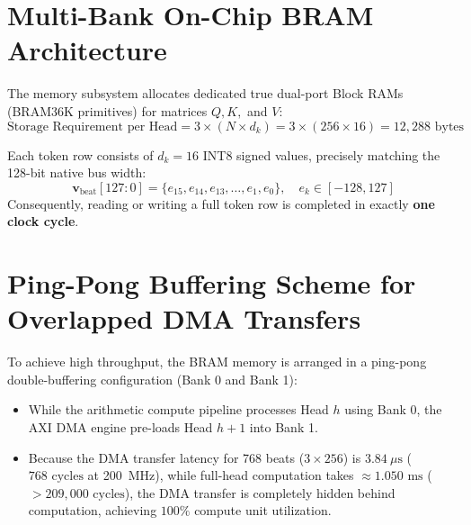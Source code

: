\section{Multi-Bank On-Chip BRAM Architecture}
The memory subsystem allocates dedicated true dual-port Block RAMs (BRAM36K primitives) for matrices $Q, K,$ and $V$:
\begin{equation}
    \text{Storage Requirement per Head} = 3 \times (N \times d_k) = 3 \times (256 \times 16) = 12,288\text{ bytes}
\end{equation}

Each token row consists of $d_k = 16$ INT8 signed values, precisely matching the 128-bit native bus width:
\begin{equation}
    \mathbf{v}_{\text{beat}}[127:0] = \{e_{15}, e_{14}, e_{13}, \dots, e_1, e_0\}, \quad e_k \in [-128, 127]
\end{equation}
Consequently, reading or writing a full token row is completed in exactly \textbf{one clock cycle}.

\section{Ping-Pong Buffering Scheme for Overlapped DMA Transfers}
To achieve high throughput, the BRAM memory is arranged in a ping-pong double-buffering configuration (Bank 0 and Bank 1):
\begin{itemize}
    \item While the arithmetic compute pipeline processes Head $h$ using Bank 0, the AXI DMA engine pre-loads Head $h+1$ into Bank 1.
    \item Because the DMA transfer latency for 768 beats ($3 \times 256$) is $3.84\ \mu\text{s}$ ($768\text{ cycles}$ at 200~MHz), while full-head computation takes $\approx 1.050\text{ ms}$ ($> 209,000\text{ cycles}$), the DMA transfer is completely hidden behind computation, achieving $100\%$ compute unit utilization.
\end{itemize}

